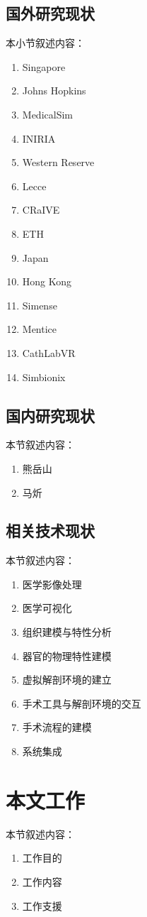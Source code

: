 \subsection{国外研究现状}

本小节叙述内容：
\begin{enumerate}
  \item Singapore
  \item Johns Hopkins
  \item MedicalSim
  \item INIRIA
  \item Western Reserve
  \item Lecce
  \item CRaIVE
  \item ETH
  \item Japan
  \item Hong Kong
  \item Simense
  \item Mentice
  \item CathLabVR
  \item Simbionix
\end{enumerate}

\subsection{国内研究现状}

本节叙述内容：
\begin{enumerate}
  \item 熊岳山
  \item 马炘
\end{enumerate}

\subsection{相关技术现状}

本节叙述内容：
\begin{enumerate}
  \item 医学影像处理
  \item 医学可视化
  \item 组织建模与特性分析
  \item 器官的物理特性建模
  \item 虚拟解剖环境的建立
  \item 手术工具与解剖环境的交互
  \item 手术流程的建模
  \item 系统集成
\end{enumerate}

\section{本文工作}

本节叙述内容：
\begin{enumerate}
  \item 工作目的
  \item 工作内容
  \item 工作支援
\end{enumerate}
